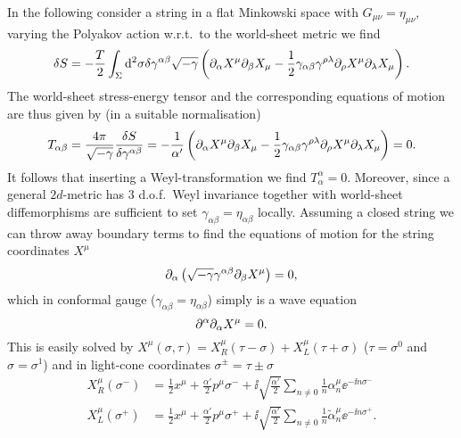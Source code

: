 In the following consider a string in a flat Minkowski space with $G_{\mu\nu}=\eta_{\mu\nu}$, varying the Polyakov action w.r.t.\ to the world-sheet metric we find 
\begin{equation}
    \delta S = -\frac{T}{2}\int_\Sigma \mathrm{d}^2\sigma \delta\gamma^{\alpha\beta}\sqrt{-\gamma}\left(\partial_\alpha X^\mu\partial_\beta X_\mu-\frac{1}{2}\gamma_{\alpha\beta}\gamma^{\rho\lambda}\partial_\rho X^\mu\partial_\lambda X_\mu\right).
\end{equation}
The world-sheet stress-energy tensor and the corresponding equations of motion are thus given by (in a suitable normalisation)
\begin{equation}
    T_{\alpha\beta}= \frac{4\pi}{\sqrt{-\gamma}}\frac{\delta S}{\delta\gamma^{\alpha\beta}} = -\frac{1}{\alpha'}\left(\partial_\alpha X^\mu\partial_\beta X_\mu-\frac{1}{2}\gamma_{\alpha\beta}\gamma^{\rho\lambda}\partial_\rho X^\mu\partial_\lambda X_\mu\right) = 0.
\end{equation}
It follows that inserting a Weyl-transformation we find $T^{\alpha}_\alpha=0$. Moreover, since a general $2d$-metric has $3$ d.o.f.\ Weyl invariance together with world-sheet diffemorphisms are sufficient to set $\gamma_{\alpha\beta}=\eta_{\alpha\beta}$ locally. Assuming a closed string we can throw away boundary terms to find the equations of motion for the string coordinates $X^\mu$
\begin{equation}
    \partial_\alpha\left(\sqrt{-\gamma}\gamma^{\alpha\beta}\partial_\beta X^\mu\right) = 0,
\end{equation}
which in conformal gauge ($\gamma_{\alpha\beta}=\eta_{\alpha\beta}$) simply is a wave equation 
\begin{equation}
    \partial^\alpha\partial_\alpha X^\mu = 0.
\end{equation}
This is easily solved by $X^\mu(\sigma,\tau)=X^\mu_R(\tau-\sigma)+X^\mu_L(\tau+\sigma)$ ($\tau =\sigma^0$ and $\sigma=\sigma^1$) and in light-cone coordinates $\sigma^{\pm}=\tau\pm\sigma$ 
\begin{equation}
    \begin{aligned}
        X^\mu_R(\sigma^-) &= \frac{1}{2}x^\mu+\frac{\alpha'}{2}p^\mu\sigma^-+\ii\sqrt{\frac{\alpha'}{2}}\sum_{n\neq 0}\frac{1}{n}\alpha_n^\mu\ee^{-\ii n\sigma^-}\\
        X^\mu_L(\sigma^+) &= \frac{1}{2}x^\mu+\frac{\alpha'}{2}p^\mu\sigma^++\ii\sqrt{\frac{\alpha'}{2}}\sum_{n\neq 0}\frac{1}{n}\tilde{\alpha}_n^\mu\ee^{-\ii n\sigma^+}. 
    \end{aligned}
\end{equation}
